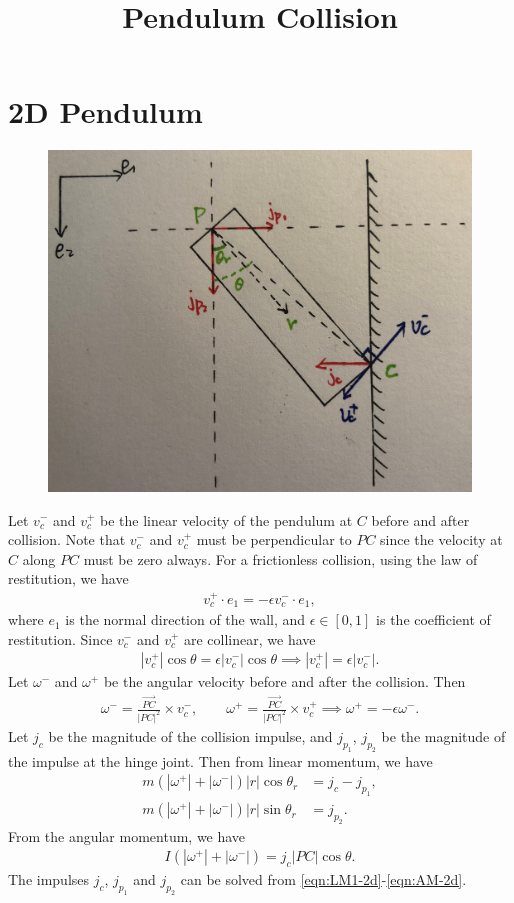 \documentclass[10pt]{article}
\title{\vspace{-4ex}\textbf{Pendulum Collision\vspace{-4ex}}}
\date{}
\begin{document}
\section{2D Pendulum}

\begin{figure}
	\centering
	\includegraphics[scale=0.08]{collision_2D.JPG}
\end{figure}

Let $v_c^-$ and $v_c^+$ be the linear velocity of the pendulum at $C$ before and after collision.
Note that $v_c^-$ and $v_c^+$ must be perpendicular to $PC$ since the velocity at $C$ along $PC$ must be zero always.
For a frictionless collision, using the law of restitution, we have
\begin{align}
	v_c^+ \cdot e_1 = -\epsilon v_c^- \cdot e_1,
\end{align}
where $e_1$ is the normal direction of the wall, and $\epsilon\in[0,1]$ is the coefficient of restitution.
Since $v_c^-$ and $v_c^+$ are collinear, we have
\begin{align}
	|v_c^+|\cos\theta = \epsilon|v_c^-|\cos\theta \implies |v_c^+| = \epsilon|v_c^-|.
\end{align}
Let $\omega^-$ and $\omega^+$ be the angular velocity before and after the collision.
Then
\begin{align}
	\omega^- = \frac{\vec{PC}}{|PC|^2} \times v_c^-, \qquad \omega^+ = \frac{\vec{PC}}{|PC|^2} \times v_c^+ \implies \omega^+ = -\epsilon\omega^-.
\end{align}
Let $j_c$ be the magnitude of the collision impulse, and $j_{p_1}$, $j_{p_2}$ be the magnitude of the impulse at the hinge joint.
Then from linear momentum, we have
\begin{align}
	m(|\omega^+|+|\omega^-|)|r| \cos\theta_r &= j_c - j_{p_1}, \label{eqn:LM1-2d} \\
	m(|\omega^+|+|\omega^-|)|r| \sin\theta_r &= j_{p_2}.
\end{align}
From the angular momentum, we have
\begin{align}
	I(|\omega^+|+|\omega^-|) = j_c |PC| \cos\theta \label{eqn:AM-2d}.
\end{align}
The impulses $j_c$, $j_{p_1}$ and $j_{p_2}$ can be solved from \eqref{eqn:LM1-2d}-\eqref{eqn:AM-2d}.
\end{document}
